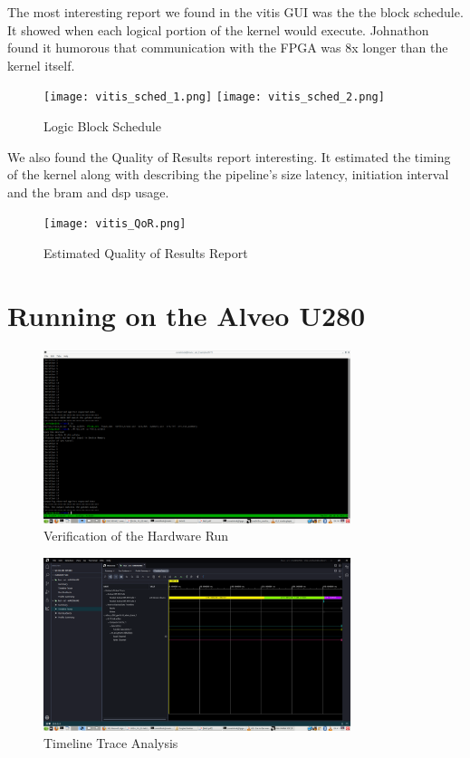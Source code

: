 \documentclass[11pt]{article}
\begin{document}
      The most interesting report we found in the vitis GUI was the the block schedule. It showed
      when each logical portion of the kernel would execute. Johnathon found it humorous that
      communication with the FPGA was 8x longer than the kernel itself.

      \begin{figure}[H]
        \centering
        \texttt{[image: vitis\_sched\_1.png]}
        \hfill
        \texttt{[image: vitis\_sched\_2.png]}
        \caption{Logic Block Schedule}
        \label{fig:vitis_sched_2}
      \end{figure}

      We also found the Quality of Results report interesting. It estimated the timing of the kernel along
      with describing the pipeline's size latency, initiation interval and the bram and dsp usage.

      \begin{figure}[H]
        \centering
        \texttt{[image: vitis\_QoR.png]}
        \caption{Estimated Quality of Results Report}
        \label{fig:vitis_QoR}
      \end{figure}
    \section{Running on the Alveo U280}
      \begin{figure}[H]
        \centering
        \includegraphics[width=0.8\textwidth]{hardware_run.png}
        \caption{Verification of the Hardware Run}
        \label{fig:hw_run}
      \end{figure}

      \begin{figure}[H]
        \centering
        \includegraphics[width=0.8\textwidth]{timeline_trace.png}
        \caption{Timeline Trace Analysis}
        \label{fig:timeline}
      \end{figure}
\end{document}
